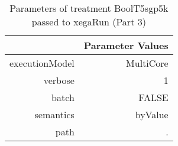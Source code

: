 \begin{table}[ht]
\centering
\begin{tabular}{rr}
  \hline
 & Parameter Values \\ 
  \hline
executionModel & MultiCore \\ 
  verbose & 1 \\ 
  batch & FALSE \\ 
  semantics & byValue \\ 
  path & . \\ 
   \hline
\end{tabular}
\caption{ Parameters of treatment BoolT5sgp5k passed to xegaRun
 (Part 3)} 
\end{table}
